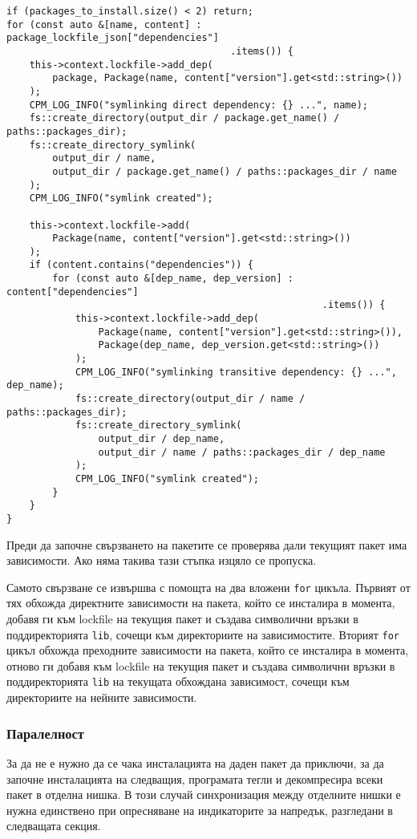 \begin{lstlisting}[style=cpp,
				   caption=Създаване на символичните връзки,
				   label={lst:symlinks}]
if (packages_to_install.size() < 2) return;
for (const auto &[name, content] : package_lockfile_json["dependencies"]
								       .items()) {
	this->context.lockfile->add_dep(
		package, Package(name, content["version"].get<std::string>())
	);
	CPM_LOG_INFO("symlinking direct dependency: {} ...", name);
	fs::create_directory(output_dir / package.get_name() / paths::packages_dir);
	fs::create_directory_symlink(
		output_dir / name,
		output_dir / package.get_name() / paths::packages_dir / name
	);
	CPM_LOG_INFO("symlink created");

	this->context.lockfile->add(
		Package(name, content["version"].get<std::string>())
	);
	if (content.contains("dependencies")) {
		for (const auto &[dep_name, dep_version] : content["dependencies"]
												       .items()) {
			this->context.lockfile->add_dep(
				Package(name, content["version"].get<std::string>()),
				Package(dep_name, dep_version.get<std::string>())
			);
			CPM_LOG_INFO("symlinking transitive dependency: {} ...", dep_name);
			fs::create_directory(output_dir / name / paths::packages_dir);
			fs::create_directory_symlink(
				output_dir / dep_name,
				output_dir / name / paths::packages_dir / dep_name
			);
			CPM_LOG_INFO("symlink created");
		}
	}
}
\end{lstlisting}

Преди да започне свързването на пакетите се проверява дали текущият пакет има
зависимости. Ако няма такива тази стъпка изцяло се пропуска.

Самото свързване се извършва с помощта на два вложени \texttt{for} цикъла.
Първият от тях обхожда директните зависимости на пакета, който се инсталира в
момента, добавя ги към lockfile на текущия пакет и създава символични връзки в
поддиректорията \texttt{lib}, сочещи към директориите на зависимостите. Вторият
\texttt{for} цикъл обхожда преходните зависимости на пакета, който се инсталира
в момента, отново ги добавя към lockfile на текущия пакет и създава символични
връзки в поддиректорията \texttt{lib} на текущата обхождана зависимост, сочещи
към директориите на нейните зависимости.


\subsubsection{Паралелност}

За да не е нужно да се чака инсталацията на даден пакет да приключи, за да
започне инсталацията на следващия, програмата тегли и декомпресира всеки пакет в
отделна нишка. В този случай синхронизация между отделните нишки е нужна
единствено при опресняване на индикаторите за напредък, разгледани в следващата
секция.


